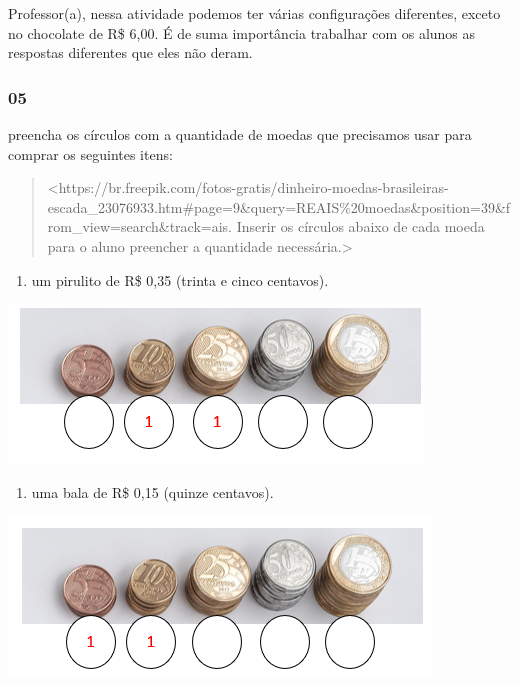 Professor(a), nessa atividade podemos ter várias configurações
diferentes, exceto no chocolate de R\$ 6,00. É de suma importância
trabalhar com os alunos as respostas diferentes que eles não deram.

\subsubsection{05}\label{section-58}

preencha os círculos com a quantidade de moedas que precisamos usar para
comprar os seguintes itens:

\begin{quote}
\textless{}https://br.freepik.com/fotos-gratis/dinheiro-moedas-brasileiras-escada\_23076933.htm\#page=9\&query=REAIS\%20moedas\&position=39\&from\_view=search\&track=ais.
Inserir os círculos abaixo de cada moeda para o aluno preencher a
quantidade necessária.\textgreater{}
\end{quote}

\begin{enumerate}
\def\labelenumi{\Alph{enumi})}
\item
  um pirulito de R\$ 0,35 (trinta e cinco centavos).
\end{enumerate}

\includegraphics[width=4.34436in,height=1.66690in]{media/image71.png}

\begin{enumerate}
\def\labelenumi{\Alph{enumi})}
\item
  uma bala de R\$ 0,15 (quinze centavos).
\end{enumerate}

\includegraphics[width=4.41728in,height=1.68774in]{media/image72.png}

